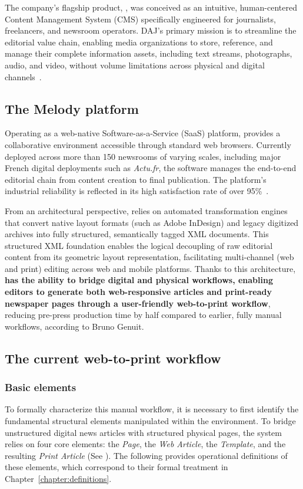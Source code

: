 The company's flagship product, \melody, was conceived as an intuitive, human-centered Content Management System (CMS) specifically engineered for journalists, freelancers, and newsroom operators. DAJ's primary mission is to streamline the editorial value chain, enabling media organizations to store, reference, and manage their complete information assets, including text streams, photographs, audio, and video, without volume limitations across physical and digital channels~\cite{melody}.

\subsection{The Melody platform}

Operating as a web-native Software-as-a-Service (SaaS) platform, \melody provides a collaborative environment accessible through standard web browsers. Currently deployed across more than 150 newsrooms of varying scales, including major French digital deployments such as \emph{Actu.fr}, the software manages the end-to-end editorial chain from content creation to final publication. The platform's industrial reliability is reflected in its high satisfaction rate of over 95\%~\cite{melody}. 

From an architectural perspective, \melody relies on automated transformation engines that convert native layout formats (such as Adobe InDesign) and legacy digitized archives into fully structured, semantically tagged XML documents. This structured XML foundation enables the logical decoupling of raw editorial content from its geometric layout representation, facilitating multi-channel (web and print) editing across web and mobile platforms. Thanks to this architecture, \textbf{\melody has the ability to bridge digital and physical workflows, enabling editors to generate both web-responsive articles and print-ready newspaper pages through a user-friendly web-to-print workflow}, reducing pre-press production time by half compared to earlier, fully manual workflows, according to Bruno Genuit.



\subsection{The current web-to-print workflow}

\subsubsection{Basic elements}
\label{sec:basic-elements}
To formally characterize this manual workflow, it is necessary to first identify the fundamental structural elements manipulated within the \melody environment. To bridge unstructured digital news articles with structured physical  pages, the system relies on four core elements: the \emph{Page}, the \emph{Web Article}, the \emph{Template}, and the resulting \emph{Print Article} (See ). The following provides operational definitions of these elements, which correspond to their formal treatment in Chapter~\ref{chapter:definitions}.

